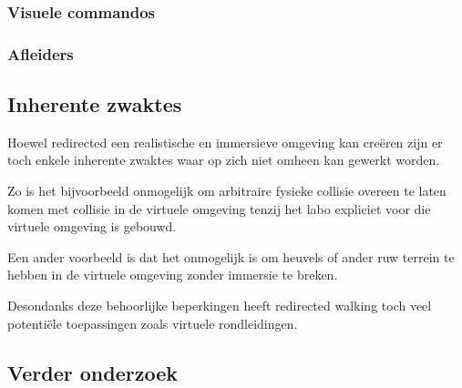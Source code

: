 \documentclass[a4paper,12pt]{article}
\begin{document}
\subsubsection{Visuele commandos}


\subsubsection{Afleiders}


\subsection{Inherente zwaktes}
Hoewel redirected een realistische en immersieve omgeving kan cre\"eren zijn er
toch enkele inherente zwaktes waar op zich niet omheen kan gewerkt worden.

Zo is het bijvoorbeeld onmogelijk om arbitraire fysieke collisie overeen te laten
komen met collisie in de virtuele omgeving tenzij het labo expliciet voor die
virtuele omgeving is gebouwd.

Een ander voorbeeld is dat het onmogelijk is om heuvels of ander ruw terrein te
hebben in de virtuele omgeving zonder immersie te breken.

Desondanks deze behoorlijke beperkingen heeft redirected walking toch veel
potenti\"ele toepassingen zoals virtuele rondleidingen.


\subsection{Verder onderzoek}


\newpage


\end{document}
